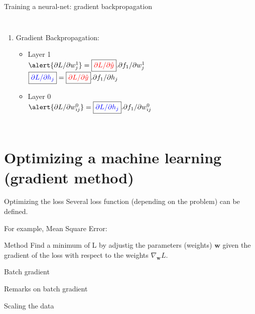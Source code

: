 \documentclass[handout]{beamer}
\begin{document}
\begin{frame}{Training a neural-net: gradient backpropagation}
\begin{columns}
\begin{enumerate}[<+->]
    \item \alert{Gradient Backpropagation:}
    \begin{itemize}
   \item Layer 1\\
   $\alert{\partial L/\partial w_j^1} = 
   \boxed{\color{red}\partial L/\partial \hat{y}}.
   \partial f_1 / \partial w^1_j$\\
   
   $ \boxed{\color{blue}\partial L/\partial h_j} = 
    \boxed{\color{red}\partial L/\partial \hat{y}}. 
   \partial f_1 / \partial h_j$
   
   \item Layer 0\\
   $\alert{\partial L/\partial w^0_{ij}}=
  \boxed{\color{blue}\partial L/\partial h_j}
   .\partial f_1 / \partial w^0_{ij}  $
    
    \end{itemize}
\end{enumerate}

\end{columns}

\end{frame}

\section{Optimizing a machine learning (gradient method)}

\begin{frame}{Optimizing the loss}
    Several loss function (depending on the problem) can be defined.
    
    For example, Mean Square Error:
    
    \begin{alertblock}{Method}
    Find a minimum of L by adjustig the parameters (weights) $\mathbf{w}$ given the gradient of the loss with respect to the weights $\nabla_\mathbf{w}L$.
    \end{alertblock}
\end{frame}

\begin{frame}{Batch gradient}
    
\end{frame}

\begin{frame}{Remarks on batch gradient}
    
\end{frame}

\begin{frame}{Scaling the data}
    
\end{frame}
\end{document}
